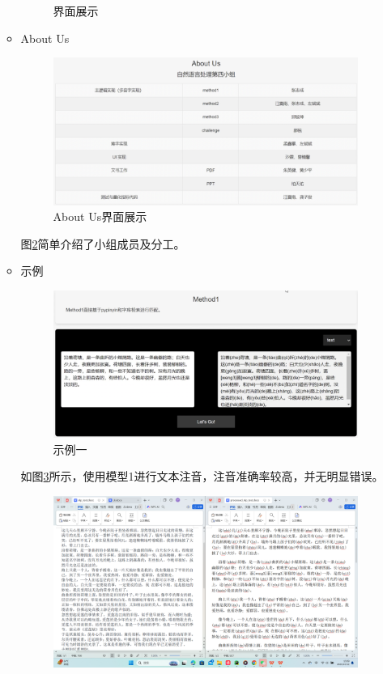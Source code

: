 \documentclass[12pt,hyperref,a4paper,UTF8]{ctexart}
\begin{document}
\begin{itemize}
\begin{itemize}
\begin{figure}[htbp]
            \caption{界面展示}
            \label{fig_E2}
        \end{figure} 
        \item About Us
        \begin{figure}[H]
            \centering
            \includegraphics[width=0.7\linewidth]{figures/fig7.png}
            \caption{About Us界面展示}
            \label{fig7}
        \end{figure}
        图\ref{fig7}简单介绍了小组成员及分工。
        \item 示例
        \begin{figure}[H]
            \centering
            \includegraphics[width=0.7\linewidth]{figures/fig8.png}
            \caption{示例一}
            \label{fig8}
        \end{figure}
        如图\ref{fig8}所示，使用模型1进行文本注音，注音准确率较高，并无明显错误。
        \begin{figure}[H]
            \centering
            \includegraphics[width=0.7\linewidth]{figures/fig9.pic.jpg}

\end{figure}
\end{itemize}
\end{itemize}
\end{document}
